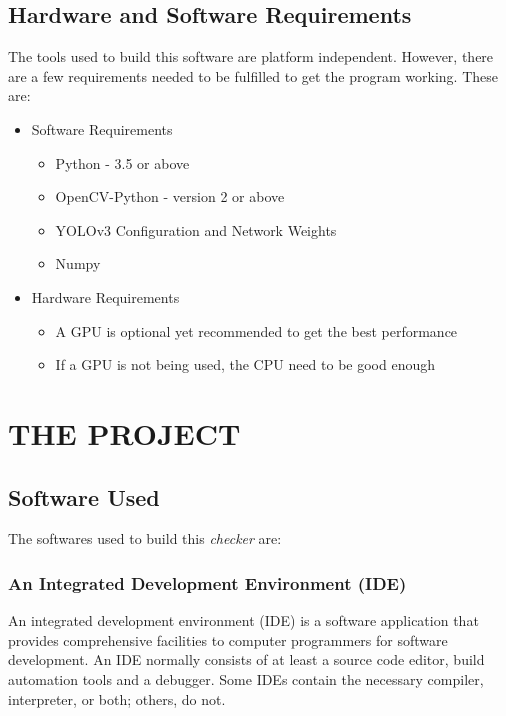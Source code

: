 \documentclass[a4paper]{article}
\begin{document}
\subsection{Hardware and Software Requirements}
The tools used to build this software are platform independent. However,
there are a few requirements needed to be fulfilled to get the program
working. These are:

\begin{itemize}
    \item Software Requirements
          \begin{itemize}
              \item Python - 3.5 or above
              \item OpenCV-Python - version 2 or above
              \item YOLOv3 Configuration and Network Weights
              \item Numpy
          \end{itemize}

    \item Hardware Requirements
          \begin{itemize}
              \item A GPU is optional yet recommended to get the best performance
              \item If a GPU is not being used, the CPU need to be good enough
          \end{itemize}
\end{itemize}
\pagebreak

\section{THE PROJECT}
\subsection{Software Used}
The softwares used to build this \textit{checker} are:

\subsubsection{An Integrated Development Environment (IDE)}
An integrated development environment (IDE) is a software application that
provides comprehensive facilities to computer programmers for software
development. An IDE normally consists of at least a source code editor, build
automation tools and a debugger. Some IDEs contain the necessary compiler,
interpreter, or both; others, do not.
\end{document}
